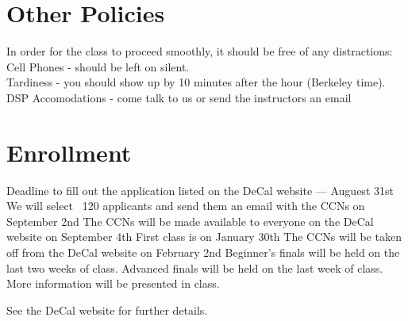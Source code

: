 \documentclass[11pt]{article}
\begin{document}
\section*{Other Policies}
In order for the class to proceed smoothly, it should be free of any distractions: \\
Cell Phones - should be left on silent.\\
Tardiness - you should show up by 10 minutes after the hour (Berkeley time).\\
DSP Accomodations - come talk to us or send the instructors an email

\section*{Enrollment}
Deadline to fill out the application listed on the DeCal website — Auguest 31st
We will select ~120 applicants and send them an email with the CCNs on September 2nd
The CCNs will be made available to everyone on the DeCal website on September 4th
First class is on January 30th
The CCNs will be taken off from the DeCal website on February 2nd
Beginner’s finals will be held on the last two weeks of class. Advanced finals will be held on the last week of class. More information will be presented in class.

See the DeCal website for further details.
\end{document}
